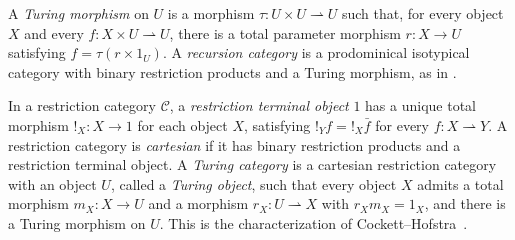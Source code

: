A \emph{Turing morphism} on $U$ is a morphism
$\tau:U\times U\rightharpoonup U$ such that, for every object $X$
and every $f:X\times U\rightharpoonup U$, there is a total
parameter morphism $r:X\to U$ satisfying $f=\tau(r\times1_U)$.
A \emph{recursion category} is a prodominical isotypical
category with binary restriction products and a Turing morphism,
as in \cite[Section 9]{Heller}.

In a restriction category $\mathcal C$, a \emph{restriction terminal object}
$1$ has a unique total morphism $!_X:X\to1$ for each object $X$,
satisfying $!_Yf=!_X\bar f$ for every $f:X\rightharpoonup Y$.
A restriction category is \emph{cartesian} if it has binary
restriction products and a restriction terminal object.
A \emph{Turing category} is a cartesian restriction category with an
object $U$, called a \emph{Turing object}, such that every object $X$
admits a total morphism $m_X:X\to U$ and a morphism
$r_X:U\rightharpoonup X$ with $r_Xm_X=1_X$, and there is a
Turing morphism on $U$. This is the characterization of
Cockett--Hofstra~\cite[Theorem 3.4]{CockettHofstra}.


